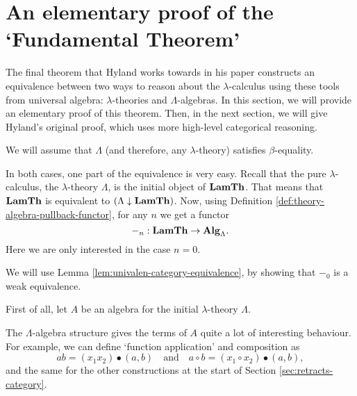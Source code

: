 

\section{An elementary proof of the `Fundamental Theorem'}\label{sec:elementary-fundamental-theorem}
The final theorem that Hyland works towards in his paper constructs an equivalence between two ways to reason about the $ \lambda $-calculus using these tools from universal algebra: $ \lambda $-theories and $ \Lambda $-algebras. In this section, we will provide an elementary proof of this theorem. Then, in the next section, we will give Hyland's original proof, which uses more high-level categorical reasoning.

We will assume that $ \Lambda $ (and therefore, any $ \lambda $-theory) satisfies $ \beta $-equality.

In both cases, one part of the equivalence is very easy. Recall that the pure $ \lambda $-calculus, the $ \lambda $-theory $ \Lambda $, is the initial object of $ \mathbf{LamTh} $. That means that $ \mathbf{LamTh} $ is equivalent to $ (\Lambda \downarrow \mathbf{LamTh}) $. Now, using Definition \ref{def:theory-algebra-pullback-functor}, for any $ n $ we get a functor
\[ -_n : \mathbf{LamTh} \to \mathbf{Alg}_{\Lambda}. \]
Here we are only interested in the case $ n = 0 $.

We will use Lemma \ref{lem:univalen-category-equivalence}, by showing that $ -_0 $ is a weak equivalence.

First of all, let $ A $ be an algebra for the initial $ \lambda $-theory $ \Lambda $.

The $ \Lambda $-algebra structure gives the terms of $ A $ quite a lot of interesting behaviour. For example, we can define `function application' and composition as
\[ a b = (x_1 x_2) \bullet (a, b) \quad \text{and} \quad a \circ b = (x_1 \circ x_2) \bullet (a, b), \]
and the same for the other constructions at the start of Section \ref{sec:retracts-category}.

